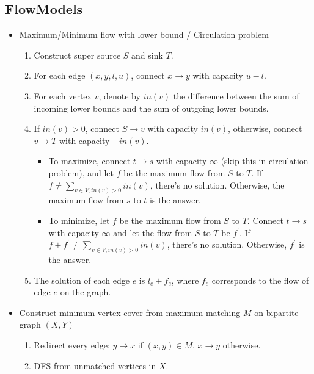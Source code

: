 \documentclass[10pt, a4paper, twocolumn, oneside]{article}
\begin{document}
\subsection{FlowModels}
\begin{itemize}
    \itemsep-0.3em
    \item Maximum/Minimum flow with lower bound / Circulation problem
    \vspace{-1em}
    \begin{enumerate}
        \itemsep-0.3em
        \item Construct super source $S$ and sink $T$.
        \item For each edge $(x, y, l, u)$, connect $x \rightarrow y$ with capacity $u - l$.
        \item For each vertex $v$, denote by $in(v)$ the difference between the sum of incoming lower bounds and the sum of outgoing lower bounds.
        \item If $in(v) > 0$, connect $S \rightarrow v$ with capacity $in(v)$, otherwise, connect $v \rightarrow T$ with capacity $-in(v)$.
        \begin{itemize}
            \itemsep-0.2em
            \item To maximize, connect $t \rightarrow s$ with capacity $\infty$ (skip this in circulation problem), and let $f$ be the maximum flow from $S$ to $T$. If $f \neq \sum_{v \in V, in(v) > 0}{in(v)}$, there's no solution. Otherwise, the maximum flow from $s$ to $t$ is the answer.
            \item To minimize, let $f$ be the maximum flow from $S$ to $T$. Connect $t \rightarrow s$ with capacity $\infty$ and let the flow from $S$ to $T$ be $f^\prime$. If $f + f^\prime \neq \sum_{v \in V, in(v) > 0}{in(v)}$, there's no solution. Otherwise, $f^\prime$ is the answer.
        \end{itemize}
        \item The solution of each edge $e$ is $l_e + f_e$, where $f_e$ corresponds to the flow of edge $e$ on the graph.
    \end{enumerate}
    \item Construct minimum vertex cover from maximum matching $M$ on bipartite graph $(X, Y)$
    \vspace{-1em}
    \begin{enumerate}
        \itemsep-0.3em
        \item Redirect every edge: $y \rightarrow x$ if $(x, y) \in M$, $x \rightarrow y$ otherwise.
        \item DFS from unmatched vertices in $X$.

\end{enumerate}
\end{itemize}
\end{document}
